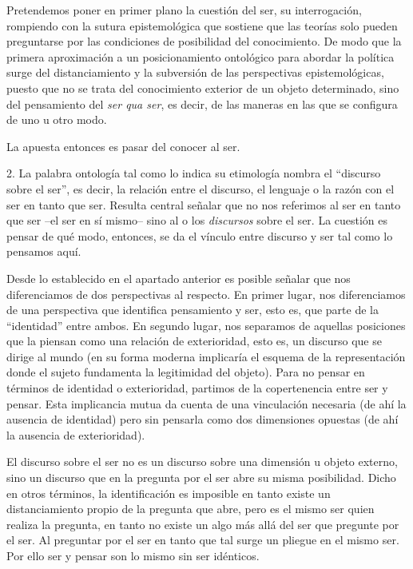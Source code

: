 Pretendemos poner en primer plano la cuestión del ser, su interrogación,
rompiendo con la sutura epistemológica que sostiene que las teorías solo
pueden preguntarse por las condiciones de posibilidad del conocimiento.
De modo que la primera aproximación a un posicionamiento ontológico para
abordar la política surge del distanciamiento y la subversión de las
perspectivas epistemológicas, puesto que no se trata del conocimiento
exterior de un objeto determinado, sino del pensamiento del \emph{ser
qua ser}, es decir, de las maneras en las que se configura de uno u otro
modo.

La apuesta entonces es pasar del conocer al ser.

2. La palabra ontología tal como lo indica su etimología nombra el
\enquote{discurso sobre el ser}, es decir, la relación entre el discurso, el
lenguaje o la razón con el ser en tanto que ser. Resulta central señalar
que no nos referimos al ser en tanto que ser --el ser en sí mismo-- sino
al o los \emph{discursos} sobre el ser. La cuestión es pensar de qué
modo, entonces, se da el vínculo entre discurso y ser tal como lo
pensamos aquí.

Desde lo establecido en el apartado anterior es posible señalar que nos
diferenciamos de dos perspectivas al respecto. En primer lugar, nos
diferenciamos de una perspectiva que identifica pensamiento y ser, esto
es, que parte de la \enquote{identidad} entre ambos. En segundo lugar, nos
separamos de aquellas posiciones que la piensan como una relación de
exterioridad, esto es, un discurso que se dirige al mundo (en su forma
moderna implicaría el esquema de la representación donde el sujeto
fundamenta la legitimidad del objeto). Para no pensar en términos de
identidad o exterioridad, partimos de la copertenencia entre ser y
pensar. Esta implicancia mutua da cuenta de una vinculación necesaria
(de ahí la ausencia de identidad) pero sin pensarla como dos dimensiones
opuestas (de ahí la ausencia de exterioridad).

El discurso sobre el ser no es un discurso sobre una dimensión u objeto
externo, sino un discurso que en la pregunta por el ser abre su misma
posibilidad. Dicho en otros términos, la identificación es imposible en
tanto existe un distanciamiento propio de la pregunta que abre, pero es
el mismo ser quien realiza la pregunta, en tanto no existe un algo más
allá del ser que pregunte por el ser. Al preguntar por el ser en tanto
que tal surge un pliegue en el mismo ser. Por ello ser y pensar son lo
mismo sin ser idénticos.

